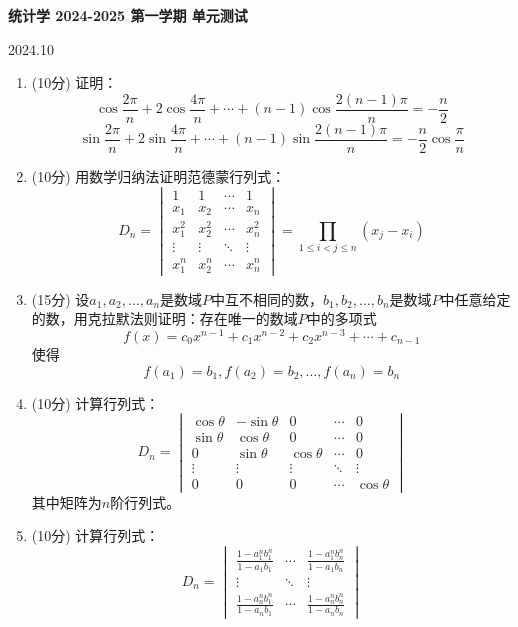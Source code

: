 \documentclass[a4paper,12pt]{article}
\begin{document}
\begin{center}
\Large\textbf{统计学 2024-2025 第一学期 单元测试}

\vspace{0.5cm}
\normalsize 2024.10
\end{center}

\vspace{0.5cm}

\begin{enumerate}[leftmargin=*]

\item (10分) 证明：
\[
\cos\frac{2\pi}{n} + 2\cos\frac{4\pi}{n} + \cdots + (n-1)\cos\frac{2(n-1)\pi}{n} = -\frac{n}{2}
\]
\[
\sin\frac{2\pi}{n} + 2\sin\frac{4\pi}{n} + \cdots + (n-1)\sin\frac{2(n-1)\pi}{n} = -\frac{n}{2}\cos\frac{\pi}{n}
\]

\item (10分) 用数学归纳法证明范德蒙行列式：
\[
D_n = \begin{vmatrix}
1 & 1 & \cdots & 1 \\
x_1 & x_2 & \cdots & x_n \\
x_1^2 & x_2^2 & \cdots & x_n^2 \\
\vdots & \vdots & \ddots & \vdots \\
x_1^n & x_2^n & \cdots & x_n^n
\end{vmatrix} = \prod_{1\leq i < j \leq n}(x_j - x_i)
\]

\item (15分) 设$a_1, a_2, \ldots, a_n$是数域$P$中互不相同的数，$b_1, b_2, \ldots, b_n$是数域$P$中任意给定的数，用克拉默法则证明：存在唯一的数域$P$中的多项式
\[
f(x) = c_0x^{n-1} + c_1x^{n-2} + c_2x^{n-3} + \cdots + c_{n-1}
\]
使得
\[
f(a_1) = b_1, f(a_2) = b_2, \ldots, f(a_n) = b_n
\]

\item (10分) 计算行列式：
\[
D_n = \begin{vmatrix}
\cos\theta & -\sin\theta & 0 & \cdots & 0 \\
\sin\theta & \cos\theta & 0 & \cdots & 0 \\
0 & \sin\theta & \cos\theta & \cdots & 0 \\
\vdots & \vdots & \vdots & \ddots & \vdots \\
0 & 0 & 0 & \cdots & \cos\theta
\end{vmatrix}
\]
其中矩阵为$n$阶行列式。

\item (10分) 计算行列式：
\[
D_n = \begin{vmatrix}
\frac{1-a_1^nb_1^n}{1-a_1b_1} & \cdots & \frac{1-a_1^nb_n^n}{1-a_1b_n} \\
\vdots & \ddots & \vdots \\
\frac{1-a_n^nb_1^n}{1-a_nb_1} & \cdots & \frac{1-a_n^nb_n^n}{1-a_nb_n}
\end{vmatrix}
\]


\end{enumerate}
\end{document}
